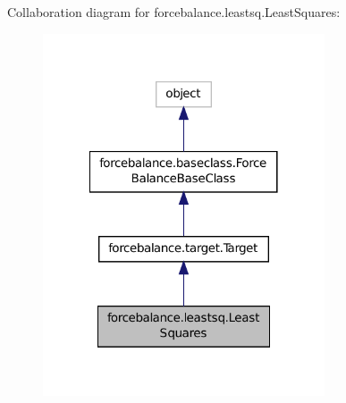 Collaboration diagram for forcebalance.\-leastsq.\-Least\-Squares\-:\nopagebreak
\begin{figure}[H]
\begin{center}
\leavevmode
\includegraphics[width=236pt]{classforcebalance_1_1leastsq_1_1LeastSquares__coll__graph}
\end{center}
\end{figure}
